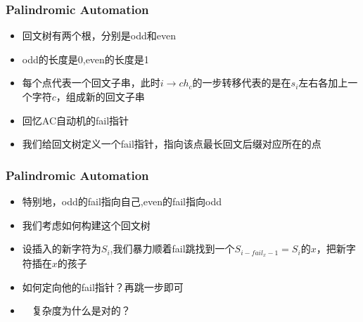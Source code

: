 \documentclass[notheorems]{beamer}
\begin{document}
\begin{frame}
\frametitle{Palindromic Automation}
\begin{itemize}
\item 回文树有两个根，分别是odd和even
\item odd的长度是0,even的长度是1
\pause
\item 每个点代表一个回文子串，此时$i \to ch_c$的一步转移代表的是在$s_i$左右各加上一个字符$c$，组成新的回文子串
\pause
\item 回忆AC自动机的fail指针
\item 我们给回文树定义一个fail指针，指向该点最长回文后缀对应所在的点
\end{itemize}
\end{frame}

\begin{frame}
\frametitle{Palindromic Automation}
\begin{itemize}
\item 特别地，odd的fail指向自己,even的fail指向odd
\pause
\item 我们考虑如何构建这个回文树
\item 设插入的新字符为$S_i$,我们暴力顺着fail跳找到一个$S_{i-fail_x-1}=S_{i}$的$x$，把新字符插在$x$的孩子
\pause
\item 如何定向他的fail指针？再跳一步即可
\pause
\item　复杂度为什么是对的？
\end{itemize}
\end{frame}
\end{document}
